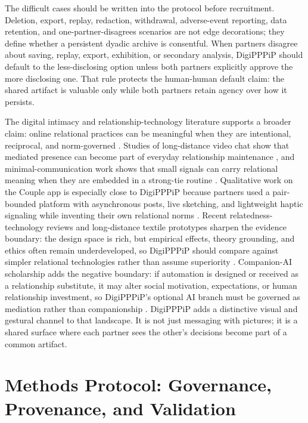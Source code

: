 \documentclass[
  english,
]{article}
\begin{document}
The difficult cases should be written into the protocol before
recruitment. Deletion, export, replay, redaction, withdrawal,
adverse-event reporting, data retention, and one-partner-disagrees
scenarios are not edge decorations; they define whether a persistent
dyadic archive is consentful. When partners disagree about saving,
replay, export, exhibition, or secondary analysis, DigiPPPiP should
default to the less-disclosing option unless both partners explicitly
approve the more disclosing one. That rule protects the human-human
default claim: the shared artifact is valuable only while both partners
retain agency over how it persists.

The digital intimacy and relationship-technology literature supports a
broader claim: online relational practices can be meaningful when they
are intentional, reciprocal, and norm-governed
\citep{kernova2025relationship, hassenzahl2012love, vetere2005mediating}.
Studies of long-distance video chat show that mediated presence can
become part of everyday relationship maintenance
\citep{neustaedter2012intimacy}, and minimal-communication work shows
that small signals can carry relational meaning when they are embedded
in a strong-tie routine \citep{kaye2006clicked}. Qualitative work on the
Couple app is especially close to DigiPPPiP because partners used a
pair-bounded platform with asynchronous posts, live sketching, and
lightweight haptic signaling while inventing their own relational norms
\citep{mcveighschultz2015couple}. Recent relatedness-technology reviews
and long-distance textile prototypes sharpen the evidence boundary: the
design space is rich, but empirical effects, theory grounding, and
ethics often remain underdeveloped, so DigiPPPiP should compare against
simpler relational technologies rather than assume superiority
\citep{wenhart2025relatedness, jiang2025ipillowpal}. Companion-AI
scholarship adds the negative boundary: if automation is designed or
received as a relationship substitute, it may alter social motivation,
expectations, or human relationship investment, so DigiPPPiP's optional
AI branch must be governed as mediation rather than companionship
\citep{malfacini2025companionai}. DigiPPPiP adds a distinctive visual
and gestural channel to that landscape. It is not just messaging with
pictures; it is a shared surface where each partner sees the other's
decisions become part of a common artifact.

\newpage

\section{Methods Protocol: Governance, Provenance, and
Validation}\label{sec:methods_protocol}
\end{document}
